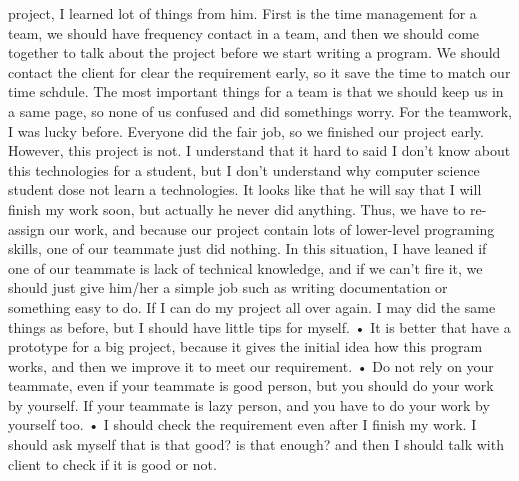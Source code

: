 project, I learned lot of things from him. First is the time management for a team, we should have frequency contact
in a team, and then we should come together to talk about the project before we start writing a program. We should
contact the client for clear the requirement early, so it save the time to match our time schdule. The most important
things for a team is that we should keep us in a same page, so none of us confused and did somethings worry. For
the teamwork, I was lucky before. Everyone did the fair job, so we finished our project early. However, this project is
not. I understand that it hard to said I don’t know about this technologies for a student, but I don’t understand why
computer science student dose not learn a technologies. It looks like that he will say that I will finish my work soon, but
actually he never did anything. Thus, we have to re-assign our work, and because our project contain lots of lower-level
programing skills, one of our teammate just did nothing. In this situation, I have leaned if one of our teammate is lack
of technical knowledge, and if we can’t fire it, we should just give him/her a simple job such as writing documentation
or something easy to do.
If I can do my project all over again. I may did the same things as before, but I should have little tips for myself.
• It is better that have a prototype for a big project, because it gives the initial idea how this program works, and then
we improve it to meet our requirement.
• Do not rely on your teammate, even if your teammate is good person, but you should do your work by yourself. If
your teammate is lazy person, and you have to do your work by yourself too.
• I should check the requirement even after I finish my work. I should ask myself that is that good? is that enough?
and then I should talk with client to check if it is good or not.
